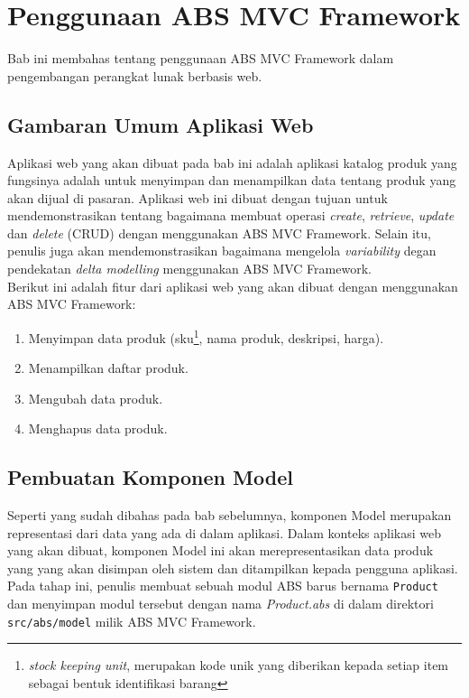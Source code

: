 \chapter{Penggunaan ABS MVC Framework}

Bab ini membahas tentang penggunaan ABS MVC Framework dalam pengembangan perangkat lunak berbasis web.

\section{Gambaran Umum Aplikasi Web}
Aplikasi web yang akan dibuat pada bab ini adalah aplikasi katalog produk yang fungsinya adalah untuk menyimpan dan menampilkan data tentang produk yang akan dijual di pasaran. Aplikasi web ini dibuat dengan tujuan untuk mendemonstrasikan tentang bagaimana membuat operasi \textit{create}, \textit{retrieve}, \textit{update} dan \textit{delete} (CRUD) dengan menggunakan ABS MVC Framework. Selain itu, penulis juga akan mendemonstrasikan bagaimana mengelola \textit{variability} degan pendekatan \textit{delta modelling} menggunakan ABS MVC Framework.\\

Berikut ini adalah fitur dari aplikasi web yang akan dibuat dengan menggunakan ABS MVC Framework:

\begin{enumerate}
    \item Menyimpan data produk (sku\footnote{\textit{stock keeping unit}, merupakan kode unik yang diberikan kepada setiap item sebagai bentuk identifikasi barang}, nama produk, deskripsi, harga).
    \item Menampilkan daftar produk.
    \item Mengubah data produk.
    \item Menghapus data produk.
\end{enumerate}

\section{Pembuatan Komponen Model}

Seperti yang sudah dibahas pada bab sebelumnya, komponen Model merupakan representasi dari data yang ada di dalam aplikasi. Dalam konteks aplikasi web yang akan dibuat, komponen Model ini akan merepresentasikan data produk yang yang akan disimpan oleh sistem dan ditampilkan kepada pengguna aplikasi. Pada tahap ini, penulis membuat sebuah modul ABS barus bernama \texttt{Product} dan menyimpan modul tersebut dengan nama \textit{Product.abs} di dalam direktori \texttt{src/abs/model} milik ABS MVC Framework.\\

